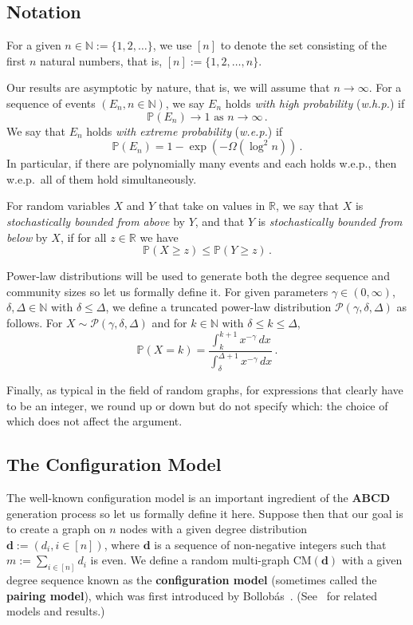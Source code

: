 \documentclass[12pt]{article}
\theoremstyle{definition}
\theoremstyle{remark}
\theoremstyle{remark}
\numberwithin{theorem}{section}
\providecommand{\R}{}
\providecommand{\N}{}
\renewcommand{\R}{\mathbb{R}}
\renewcommand{\N}{{\mathbb N}}
\newcommand{\p}[1]{\mathbb{P}\left(#1\right)}
\newcommand{\tpl}[3]{\ensuremath{\mathcal{P}\left(#1,#2,#3\right)}}
\begin{document}
\subsection{Notation} 

For a given $n \in \N := \{1, 2, \ldots \}$, we use $[n]$ to denote the set consisting of the first $n$ natural numbers, that is, $[n] := \{1, 2, \ldots, n\}$. 

Our results are asymptotic by nature, that is, we will assume that $n \to \infty$. For a sequence of events $(E_n,n \in \N)$, we say $E_n$ holds \emph{with high probability} (\emph{w.h.p.}) if 
\[
\p{E_n} \to 1 \text{ as } n \to \infty \,.
\] 
We say that $E_n$ holds \emph{with extreme probability} (\emph{w.e.p.}) if 
\[
\p{E_n} = 1 - \exp(-\Omega(\log^2 n)) \,.
\] 
In particular, if there are polynomially many events and each holds w.e.p., then w.e.p.\ all of them hold simultaneously.

For random variables $X$ and $Y$ that take on values in $\R$, we say that $X$ is \textit{stochastically bounded from above} by $Y$, and that $Y$ is \textit{stochastically bounded from below} by $X$, if for all $z \in \R$ we have 
\[
\p{X \geq z} \leq \p{Y \geq z} \,.
\]

Power-law distributions will be used to generate both the degree sequence and community sizes so let us formally define it. For given parameters $\gamma \in (0, \infty)$, $\delta, \Delta \in \N$ with $\delta \leq \Delta$, we define a truncated power-law distribution $\tpl{\gamma}{\delta}{\Delta}$ as follows. For $X \sim \tpl{\gamma}{\delta}{\Delta}$ and for $k \in \N$ with $\delta \leq k \leq \Delta$,
\[
\p{X = k} = \frac{\int_k^{k+1} x^{-\gamma} \, dx}{\int_{\delta}^{\Delta+1} x^{-\gamma} \, dx} \,.
\]

Finally, as typical in the field of random graphs, for expressions that clearly have to be an integer, we round up or down but do not specify which: the choice of which does not affect the argument. 

\subsection{The Configuration Model}\label{subsec:config}

The well-known configuration model is an important ingredient of the \textbf{ABCD} generation process so let us formally define it here. Suppose then that our goal is to create a graph on $n$ nodes with a given degree distribution $\textbf{d} := (d_i, i \in [n])$, where $\textbf{d}$ is a sequence of non-negative integers such that $m := \sum_{i \in [n]} d_i$ is even. We define a random multi-graph $\mathrm{CM}(\textbf{d})$ with a given degree sequence known as the \textbf{configuration model} (sometimes called the \textbf{pairing model}), which was first introduced by Bollob\'as~\cite{bollobas1980probabilistic}. (See~\cite{bender1978asymptotic,wormald1984generating,wormald1999models} for related models and results.)
\end{document}
